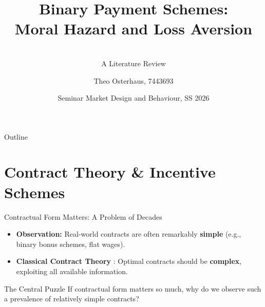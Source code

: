 \documentclass{beamer}
\title[Binary Payment Schemes]{Binary Payment Schemes: \\ Moral Hazard and Loss Aversion}
\subtitle{\cite{Herweg2010} \\ A Literature Review}
\author{Theo Osterhaus, 7443693}
\date[May 2026]{Seminar Market Design and Behaviour, SS 2026}
\institute[Uni Köln]{Department of Economics\\ Universität zu Köln}
\begin{document}
\frame{\titlepage}

\begin{frame}{Outline}
    \tableofcontents
\end{frame}


\section{Contract Theory \& Incentive Schemes}

\begin{frame}{Contractual Form Matters: A Problem of Decades}

    \begin{itemize}
    \setlength{\itemsep}{8pt}
        \item \textbf{Observation:} Real-world contracts are often remarkably \textbf{simple} (e.g., binary bonus schemes, flat wages).
        \item \textbf{Classical Contract Theory} \parencite{Holmstroem1979}: Optimal contracts should be \textbf{complex}, exploiting all available information.
    \end{itemize}

    \bigskip
    
    \begin{block}{The Central Puzzle}
        If contractual form matters so much, why do we observe such a prevalence
        of relatively simple contracts? 
    \end{block}
    
\end{frame}
\end{document}
